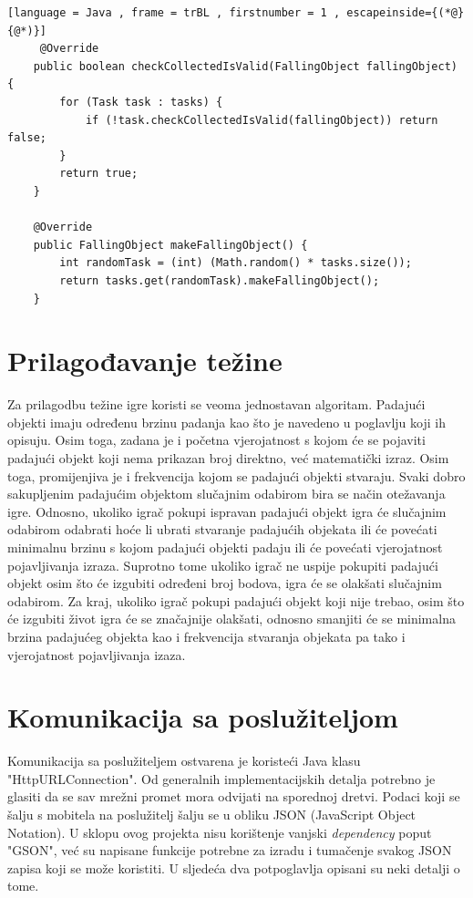 \documentclass[times, utf8, zavrsni]{fer}
\begin{document}
	\begin{lstlisting}[language = Java , frame = trBL , firstnumber = 1 , escapeinside={(*@}{@*)}]
	 @Override
    public boolean checkCollectedIsValid(FallingObject fallingObject) {
        for (Task task : tasks) {
            if (!task.checkCollectedIsValid(fallingObject)) return false;
        }
        return true;
    }

    @Override
    public FallingObject makeFallingObject() {
        int randomTask = (int) (Math.random() * tasks.size());
        return tasks.get(randomTask).makeFallingObject();
    }
	\end{lstlisting}
	
	\section{Prilagođavanje težine}
	Za prilagodbu težine igre koristi se veoma jednostavan algoritam. Padajući objekti imaju određenu brzinu padanja kao što je navedeno u poglavlju koji ih opisuju. Osim toga, zadana je i početna vjerojatnost 
	s kojom će se pojaviti padajući objekt koji nema prikazan broj direktno, već matematički izraz. Osim toga, promijenjiva je i frekvencija kojom se padajući objekti stvaraju. Svaki dobro sakupljenim padajućim objektom
	slučajnim odabirom bira se način otežavanja igre. Odnosno, ukoliko igrač pokupi ispravan padajući objekt igra će slučajnim odabirom odabrati hoće li ubrati stvaranje padajućih objekata ili će povećati minimalnu brzinu
	s kojom padajući objekti padaju ili će povećati vjerojatnost pojavljivanja izraza.
	Suprotno tome ukoliko igrač ne uspije pokupiti padajući objekt osim što će izgubiti određeni broj bodova, igra će se olakšati slučajnim odabirom. Za kraj, ukoliko igrač pokupi padajući objekt koji nije trebao, osim što će
	izgubiti život igra će se značajnije olakšati, odnosno smanjiti će se minimalna brzina padajućeg objekta kao i frekvencija stvaranja objekata pa tako i vjerojatnost pojavljivanja izaza.
	
	
	\section{Komunikacija sa poslužiteljom}
	Komunikacija sa poslužiteljem ostvarena je koristeći Java klasu "HttpURLConnection". Od generalnih implementacijskih detalja potrebno je glasiti da se sav mrežni promet mora odvijati na sporednoj dretvi. 
	Podaci koji se šalju s mobitela na poslužitelj šalju se u obliku JSON (JavaScript Object Notation). U sklopu ovog projekta nisu korištenje vanjski \textit{dependency} poput "GSON", već
	su napisane funkcije potrebne za izradu i tumačenje svakog JSON zapisa koji se može koristiti. U sljedeća dva potpoglavlja opisani su neki detalji o tome.
\end{document}
